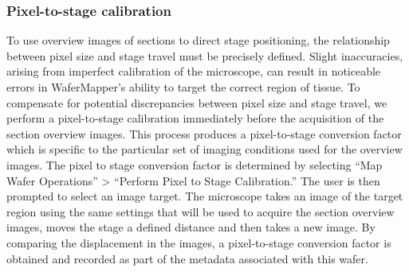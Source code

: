 \documentclass{article}
\begin{document}
\subsubsection*{Pixel-to-stage calibration}

To use overview images of sections to direct stage positioning, the relationship between pixel size and stage travel must be precisely defined. Slight inaccuracies, arising from imperfect calibration of the microscope, can result in noticeable errors in WaferMapper’s ability to target the correct region of tissue. To compensate for potential discrepancies between pixel size and stage travel, we perform a pixel-to-stage calibration immediately before the acquisition of the section overview images. This process produces a pixel-to-stage conversion factor which is specific to the particular set of imaging conditions used for the overview images. The pixel to stage conversion factor is determined by selecting “Map Wafer Operations” > “Perform Pixel to Stage Calibration.” The user is then prompted to select an image target. The microscope takes an image of the target region using the same settings that will be used to acquire the section overview images, moves the stage a defined distance and then takes a new image. By comparing the displacement in the images, a pixel-to-stage conversion factor is obtained and recorded as part of the metadata associated with this wafer.
\end{document}
